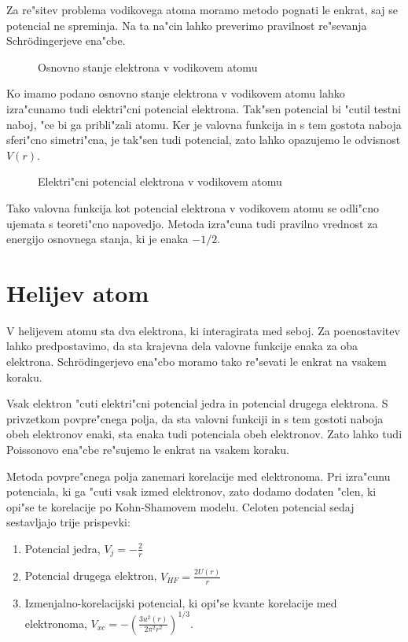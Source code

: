 \documentclass[a4paper,10pt]{article}
\begin{document}
Za re"sitev problema vodikovega atoma moramo metodo pognati le enkrat, saj se potencial ne spreminja. 
Na ta na"cin lahko preverimo pravilnost re"sevanja Schr\"odingerjeve ena"cbe. 

\begin{figure}[H]

 \caption{Osnovno stanje elektrona v vodikovem atomu}
 \label{fig:vodik-sch}
\end{figure}

Ko imamo podano osnovno stanje elektrona v vodikovem atomu lahko izra"cunamo tudi elektri"cni potencial elektrona. 
Tak"sen potencial bi "cutil testni naboj, "ce bi ga pribli"zali atomu. 
Ker je valovna funkcija in s tem gostota naboja sferi"cno simetri"cna, je tak"sen tudi potencial, zato lahko opazujemo le odvisnost $V(r)$. 

\begin{figure}[H]

 \caption{Elektri"cni potencial elektrona v vodikovem atomu}
 \label{fig:vodik-potencial}
\end{figure}

Tako valovna funkcija kot potencial elektrona v vodikovem atomu se odli"cno ujemata s teoreti"cno napovedjo. 
Metoda izra"cuna tudi pravilno vrednost za energijo osnovnega stanja, ki je enaka $-1/2$. 

\section{Helijev atom}

V helijevem atomu sta dva elektrona, ki interagirata med seboj. 
Za poenostavitev lahko predpostavimo, da sta krajevna dela valovne funkcije enaka za oba elektrona. 
Schr\"odingerjevo ena"cbo moramo tako re"sevati le enkrat na vsakem koraku. 

Vsak elektron "cuti elektri"cni potencial jedra in potencial drugega elektrona. 
S privzetkom povpre"cnega polja, da sta valovni funkciji in s tem gostoti naboja obeh elektronov enaki, sta enaka tudi potenciala obeh elektronov. 
Zato lahko tudi Poissonovo ena"cbe re"sujemo le enkrat na vsakem koraku. 

Metoda povpre"cnega polja zanemari korelacije med elektronoma. 
Pri izra"cunu potenciala, ki ga "cuti vsak izmed elektronov, zato dodamo dodaten "clen, ki opi"se te korelacije po Kohn-Shamovem modelu. 
Celoten potencial sedaj sestavljajo trije prispevki:

\begin{enumerate}
 \item Potencial jedra, $V_j = -\frac{2}{r}$
 \item Potencial drugega elektron, $V_{HF} = \frac{2U(r)}{r}$
 \item Izmenjalno-korelacijski potencial, ki opi"se kvante korelacije med elektronoma, $V_{xc} = -\left( \frac{3u^2(r)}{2\pi^2r^2} \right)^{1/3}$. 
\end{enumerate}
\end{document}
